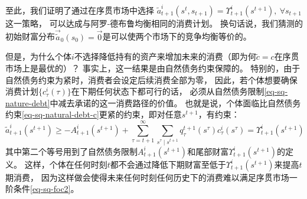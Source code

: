 至此，我们证明了通过在序贯市场中选择
$\tilde{a}_{t+1}^i\left(s^t,s_{t+1}\right)=\Upsilon_{t+1}^i\left(s^{t+1}\right), ~\forall s_{t+1}$这一策略，
可以达成与阿罗-德布鲁均衡相同的消费计划。
换句话说，我们猜测的初始财富分布$\vec{\tilde{a}}_0\left(s_0\right)=\vec{0}$是可以使两个市场下的竞争均衡等价的。

但是，为什么个体$i$不选择降低持有的资产来增加未来的消费（即为何$\tilde{c}=c$在序贯市场上是最优的）？
事实上，这一结果是由自然债务约束保障的。
特别的，由于自然债务约束为紧时，消费者会设定后续消费全部为零，
因此，若个体想要确保消费计划$\{c_{\tau}^i\left(\tau\right)\}$在下期任何状态下都可行的话，
必须从自然债务限制\ref{eq-sq-nature-debt}中减去承诺的这一消费路径的价值。
也就是说，个体面临比自然债务约束\ref{eq-sq-natural-debt-c}更紧的约束，即对任意$s^{t+1}$，有约束：
\begin{equation*}
    \tilde{a}_{t+1}^i\left(s^{t+1}\right) \geq 
        -A_{t+1}^i\left(s^{t+1}\right)
            +\sum_{\tau=t+1}^{\infty} \sum_{s^\tau \mid s^{t+1}} q_\tau^{t+1}\left(s^\tau\right) c_\tau^i\left(s^\tau\right)
                =\Upsilon_{t+1}^i\left(s^{t+1}\right)
\end{equation*}
其中第二个等号用到了自然债务限制$A_{t+1}^i\left(s^{t+1}\right)$和尾部财富$\Upsilon_{t+1}^i\left(s^{t+1}\right)$的定义。
这样，个体在任何时刻$t$都不会通过降低下期财富至低于$\Upsilon_{t+1}^i\left(s^{t+1}\right)$来提高$t$期消费，
因为这样做会使得未来任何时刻任何历史下的消费难以满足序贯市场一阶条件\ref{eq-sq-foc2}。